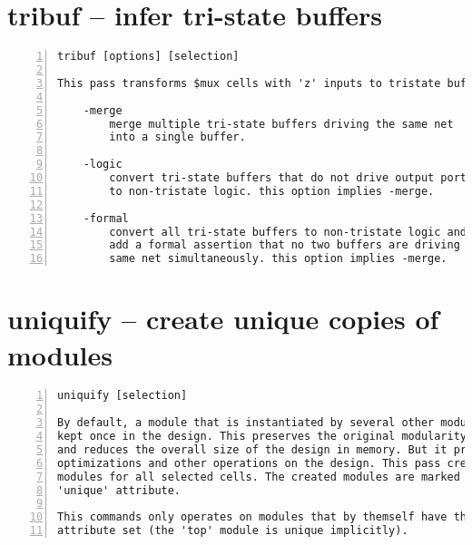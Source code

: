 \section{tribuf -- infer tri-state buffers}
\label{cmd:tribuf}
\begin{lstlisting}[numbers=left,frame=single]
    tribuf [options] [selection]

This pass transforms $mux cells with 'z' inputs to tristate buffers.

    -merge
        merge multiple tri-state buffers driving the same net
        into a single buffer.

    -logic
        convert tri-state buffers that do not drive output ports
        to non-tristate logic. this option implies -merge.

    -formal
        convert all tri-state buffers to non-tristate logic and
        add a formal assertion that no two buffers are driving the
        same net simultaneously. this option implies -merge.
\end{lstlisting}

\section{uniquify -- create unique copies of modules}
\label{cmd:uniquify}
\begin{lstlisting}[numbers=left,frame=single]
    uniquify [selection]

By default, a module that is instantiated by several other modules is only
kept once in the design. This preserves the original modularity of the design
and reduces the overall size of the design in memory. But it prevents certain
optimizations and other operations on the design. This pass creates unique
modules for all selected cells. The created modules are marked with the
'unique' attribute.

This commands only operates on modules that by themself have the 'unique'
attribute set (the 'top' module is unique implicitly).
\end{lstlisting}

